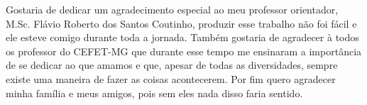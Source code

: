 %
%

\begin{agradecimentos}

Gostaria de dedicar um agradecimento especial ao meu professor orientador, M.Sc. Flávio Roberto dos Santos Coutinho, produzir esse trabalho não foi fácil e ele esteve comigo durante toda a jornada. Também gostaria de agradecer à todos os professor do CEFET-MG que durante esse tempo me ensinaram a importância de se dedicar ao que amamos e que, apesar de todas as diversidades, sempre existe uma maneira de fazer as coisas acontecerem. Por fim quero agradecer minha família e meus amigos, pois sem eles nada disso faria sentido.

\end{agradecimentos}
